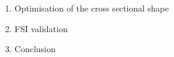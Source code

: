 \documentclass{article}
\begin{document}
\begin{enumerate}
\item Optimisation of the cross sectional shape 
\item FSI validation
\item Conclusion
\end{enumerate}
\end{document}
